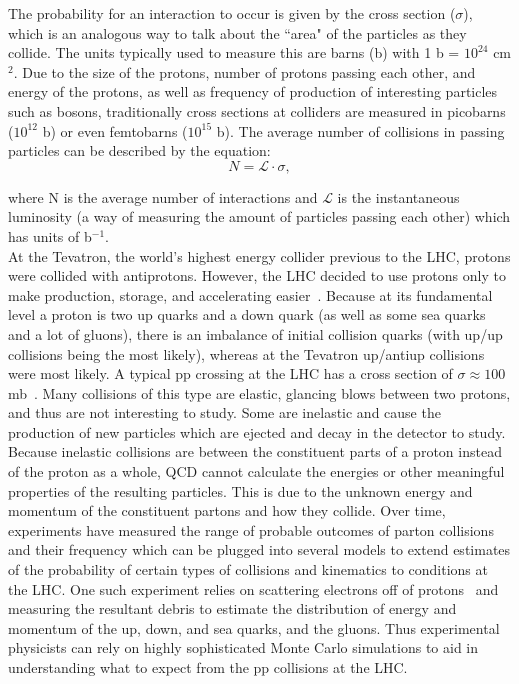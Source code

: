 The probability for an interaction to occur is given by the cross section ($\sigma$), which is an analogous way to talk about the ``area" of the particles as they collide. The units typically used to measure this are barns (b) with 1 b = $10^{24}$ cm$^2$.  Due to the size of the protons, number of protons passing each other, and energy of the protons, as well as frequency of production of interesting particles such as bosons, traditionally cross sections at colliders are measured in picobarns ($10^{12}$ b) or even femtobarns ($10^{15}$ b). The average number of collisions in passing particles can be described by the equation:
\begin{equation}
\label{eq:lumi_xsec_relationship}
N = \mathcal{L} \cdot \sigma ,
\end{equation}

where N is the average number of interactions and $\mathcal{L}$ is the instantaneous luminosity (a way of measuring the amount of particles passing each other) which has units of b$^{-1}$.\\

At the Tevatron, the world's highest energy collider previous to the LHC, protons were collided with antiprotons. However, the LHC decided to use protons only to make production, storage, and accelerating easier~\cite{lhcmachine}. Because at its fundamental level a proton is two up quarks and a down quark (as well as some sea quarks and a lot of gluons), there is an imbalance of initial collision quarks (with up/up collisions being the most likely), whereas at the Tevatron up/antiup collisions were most likely. A typical pp crossing at the LHC has a cross section of $\sigma \approx 100$ mb~\cite{qcdprimer}. Many collisions of this type are elastic, glancing blows between two protons, and thus are not interesting to study. Some are inelastic and cause the production of new particles which are ejected and decay in the detector to study. Because inelastic collisions are between the constituent parts of a proton instead of the proton as a whole, QCD cannot calculate the energies or other meaningful properties of the resulting particles. This is due to the unknown energy and momentum of the constituent partons and how they collide. Over time, experiments have measured the range of probable outcomes of parton collisions and their frequency which can be plugged into several models to extend estimates of the probability of certain types of collisions and kinematics to conditions at the LHC. One such experiment relies on scattering electrons off of protons~\cite{halzen} and measuring the resultant debris to estimate the distribution of energy and momentum of the up, down, and sea quarks, and the gluons. Thus experimental physicists can rely on highly sophisticated Monte Carlo simulations to aid in understanding what to expect from the pp collisions at the LHC.



